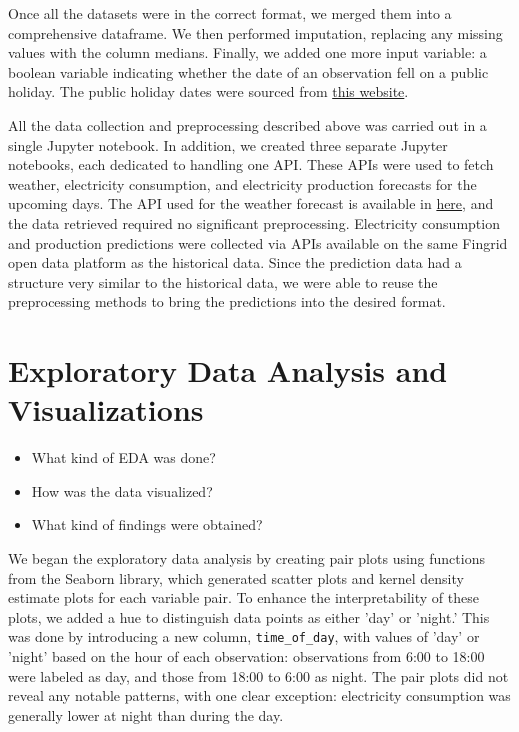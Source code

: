 \documentclass{article}
\numberwithin{equation}{section}
\begin{document}
Once all the datasets were in the correct format, we merged them into a comprehensive dataframe. We then performed imputation, replacing any missing values with the column medians. Finally, we added one more input variable: a boolean variable indicating whether the date of an observation fell on a public holiday. The public holiday dates were sourced from \href{https://www.officeholidays.com/countries/finland/2021}{this website}.

All the data collection and preprocessing described above was carried out in a single Jupyter notebook. In addition, we created three separate Jupyter notebooks, each dedicated to handling one API. These APIs were used to fetch weather, electricity consumption, and electricity production forecasts for the upcoming days. The API used for the weather forecast is available in \href{https://api.open-meteo.com/v1/forecast}{here}, and the data retrieved required no significant preprocessing. Electricity consumption and production predictions were collected via APIs available on the same Fingrid open data platform as the historical data. Since the prediction data had a structure very similar to the historical data, we were able to reuse the preprocessing methods to bring the predictions into the desired format.

\section{Exploratory Data Analysis and Visualizations}
\begin{itemize}
	\item What kind of EDA was done?
	\item How was the data visualized?
	\item What kind of findings were obtained?
\end{itemize}
We began the exploratory data analysis by creating pair plots using functions from the Seaborn library, which generated scatter plots and kernel density estimate plots for each variable pair. To enhance the interpretability of these plots, we added a hue to distinguish data points as either 'day' or 'night.' This was done by introducing a new column, \verb|time_of_day|, with values of 'day' or 'night' based on the hour of each observation: observations from 6:00 to 18:00 were labeled as day, and those from 18:00 to 6:00 as night. The pair plots did not reveal any notable patterns, with one clear exception: electricity consumption was generally lower at night than during the day.
\end{document}
